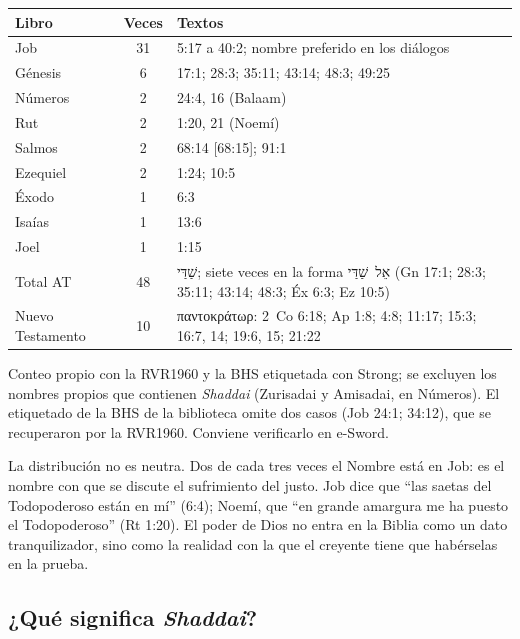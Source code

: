 \documentclass[11pt,letterpaper]{article}
\newcommand{\heb}[1]{\mbox{\foreignlanguage{hebrew}{#1}}}
\newcommand{\grc}[1]{\foreignlanguage{ancientgreek}{#1}}
\begin{document}
\begin{center}\small\renewcommand{\arraystretch}{1.2}
\begin{tabular}{@{}L{3.2cm}cL{9.6cm}@{}}
\toprule
\textbf{Libro} & \textbf{Veces} & \textbf{Textos} \\ \midrule
Job & 31 & 5:17 a 40:2; nombre preferido en los diálogos \\
Génesis & 6 & 17:1; 28:3; 35:11; 43:14; 48:3; 49:25 \\
Números & 2 & 24:4, 16 (Balaam) \\
Rut & 2 & 1:20, 21 (Noemí) \\
Salmos & 2 & 68:14 [68:15]; 91:1 \\
Ezequiel & 2 & 1:24; 10:5 \\
Éxodo & 1 & 6:3 \\
Isaías & 1 & 13:6 \\
Joel & 1 & 1:15 \\ \midrule
Total AT & 48 & \heb{שַׁדַּי}; siete veces en la forma \heb{אֵל שַׁדַּי} (Gn 17:1; 28:3; 35:11; 43:14; 48:3; Éx 6:3; Ez 10:5) \\
Nuevo Testamento & 10 & \grc{παντοκράτωρ}: 2~Co 6:18; Ap 1:8; 4:8; 11:17; 15:3; 16:7, 14; 19:6, 15; 21:22 \\
\bottomrule
\end{tabular}\end{center}

\begin{nota}[Precisión]
Conteo propio con la RVR1960 y la BHS etiquetada con Strong; se excluyen los nombres propios que contienen \emph{Shaddai} (Zurisadai y Amisadai, en Números). El etiquetado de la BHS de la biblioteca omite dos casos (Job 24:1; 34:12), que se recuperaron por la RVR1960. Conviene verificarlo en e-Sword.
\end{nota}

La distribución no es neutra. Dos de cada tres veces el Nombre está en Job: es el nombre con que se discute el sufrimiento del justo. Job dice que ``las saetas del Todopoderoso están en mí'' (6:4); Noemí, que ``en grande amargura me ha puesto el Todopoderoso'' (Rt 1:20). El poder de Dios no entra en la Biblia como un dato tranquilizador, sino como la realidad con la que el creyente tiene que habérselas en la prueba.

\subsection{¿Qué significa \emph{Shaddai}?}
\end{document}

